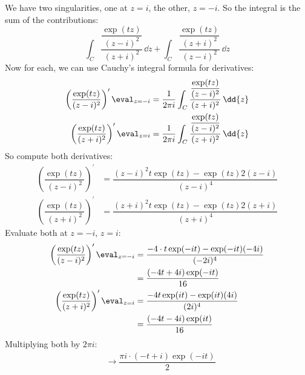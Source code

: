 \documentclass{article}
\begin{document}
    \begin{answer}
        We have two singularities, one at $z = i$, the other, $z = -i$. So the integral is the sum of the contributions:
            \begin{equation*}
                \int_{C}^{} \dfrac{\dfrac{\exp(tz)}{(z - i)^{2}}}{(z + i)^{2}} \, \dd{z} + \int_{C}^{} \dfrac{\dfrac{\exp(tz)}{(z + i)^{2}}}{(z - i)^{2}} \, \dd{z}
            \end{equation*}
        Now for each, we can use Cauchy's integral formula for derivatives:
            \begin{align*}
                \left(\dfrac{\exp(tz)}{(z - i)^{2}}\right)^{\prime}\eval_{z = -i} &= \dfrac{1}{2\pi i} \int_{C}^{} \dfrac{\dfrac{\exp(tz)}{(z - i)^{2}}}{(z + i)^{2}} \, \dd{z}  \\
                \left(\dfrac{\exp(tz)}{(z + i)^{2}}\right)^{\prime}\eval_{z = i}  &= \dfrac{1}{2\pi i} \int_{C}^{} \dfrac{\dfrac{\exp(tz)}{(z - i)^{2}}}{(z + i)^{2}} \, \dd{z}    
            \end{align*}
        So compute both derivatives:
            \begin{align*}
                \left(\dfrac{\exp(tz)}{(z - i)^{2}}\right)^{\prime} &= \dfrac{(z - i)^{2}t\exp(tz) - \exp(tz)2(z - i)}{(z - i)^{4}} \\
                \left(\dfrac{\exp(tz)}{(z + i)^{2}}\right)^{\prime} &= \dfrac{(z + i)^{2}t\exp(tz) - \exp(tz)2(z + i)}{(z + i)^{4}}   
            \end{align*}
        Evaluate both at $z = -i$, $z = i$:
            \begin{align*}
                \left(\dfrac{\exp(tz)}{(z - i)^{2}}\right)^{\prime}\eval_{z = -i} &= \dfrac{-4 \cdot t \exp(-it) - \exp(-it)(-4i)}{(-2i)^{4}} \\
                                                                                  &= \dfrac{(-4t + 4i)\exp(-it)}{16} \\
                \left(\dfrac{\exp(tz)}{(z + i)^{2}}\right)^{\prime}\eval_{z = i}  &= \dfrac{-4 t \exp(it) - \exp(it)(4i)}{(2i)^{4}} \\
                                                                                  &= \dfrac{(-4t - 4i)\exp(it)}{16}
            \end{align*}
        Multiplying both by $2\pi i$:
            \begin{align*}
                 &\rightarrow \dfrac{\pi i \cdot (-t + i)\exp(-it)}{2} \\

\end{align*}
\end{answer}
\end{document}
